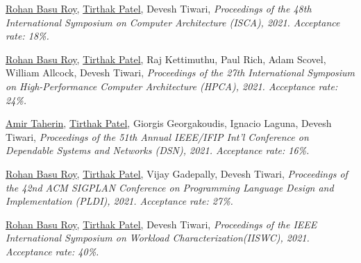 {\textnormal{\newline \underline{Rohan Basu Roy}, \underline{Tirthak Patel}, Devesh Tiwari,}} {\textit{Proceedings of the 48th International Symposium on Computer Architecture (ISCA), 2021. Acceptance rate: 18\%.\newline}}{}{}{} %

{\textnormal{\newline \underline{Rohan Basu Roy}, \underline{Tirthak Patel}, Raj Kettimuthu, Paul Rich, Adam Scovel, William Allcock, Devesh Tiwari,}} {\textit{Proceedings of the 27th International Symposium on High-Performance Computer Architecture (HPCA), 2021. Acceptance rate: 24\%.\newline}}{}{}{} %

{\textnormal{\newline \underline{Amir Taherin}, \underline{Tirthak Patel}, Giorgis Georgakoudis, Ignacio Laguna, Devesh Tiwari,}} {\textit{Proceedings of the 51th Annual IEEE/IFIP Int’l Conference on Dependable Systems and Networks (DSN), 2021. Acceptance rate: 16\%.\newline}}{}{}{} %

{\textnormal{\newline \underline{Rohan Basu Roy}, \underline{Tirthak Patel}, Vijay Gadepally, Devesh Tiwari,}} {\textit{Proceedings of the 42nd ACM SIGPLAN Conference on Programming Language Design and Implementation (PLDI), 2021. Acceptance rate: 27\%.\newline}}{}{}{} %

{\textnormal{\newline \underline{Rohan Basu Roy}, \underline{Tirthak Patel}, Devesh Tiwari,}} {\textit{Proceedings of the IEEE International Symposium on Workload Characterization(IISWC), 2021. Acceptance rate: 40\%.\newline}}{}{}{} %

